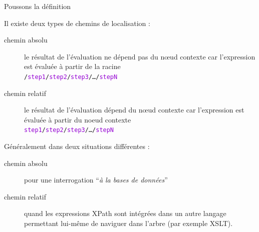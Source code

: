 \begin{frame}{Poussons la d\'efinition}

Il existe deux types de chemins de localisation : \\
\begin{description}
\item[chemin absolu] le r\'esultat de l'\'evaluation ne d\'epend pas du nœud contexte car l'expression est \'evalu\'ee \`a partir de la racine \\ \texttt{/\textcolor{DarkViolet}{step1}/\textcolor{DarkViolet}{step2}/\textcolor{DarkViolet}{step3}/…/\textcolor{DarkViolet}{stepN}}\\
\item[chemin relatif] le r\'esultat de l'\'evaluation d\'epend du nœud contexte  car l'expression est \'evalu\'ee \`a partir du n{oe}ud contexte \\ \texttt{\textcolor{DarkViolet}{step1}/\textcolor{DarkViolet}{step2}/\textcolor{DarkViolet}{step3}/…/\textcolor{DarkViolet}{stepN}} 
\end{description}

Généralement dans deux situations différentes :
\begin{description}
\item[chemin absolu] pour une interrogation ``\textit{à la bases de données}''\\
\item[chemin relatif] quand les expressions XPath sont intégrées dans un autre langage permettant lui-même de naviguer dans l'arbre (par exemple XSLT).
\end{description}

\end{frame}



